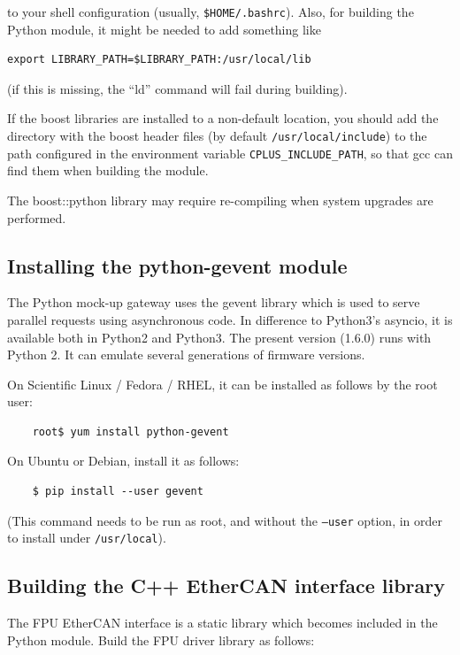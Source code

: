 \documentclass[fontsize=12,a4paper]{scrreprt}
\begin{document}
to your shell configuration (usually, \verb+$HOME/.bashrc+).
Also, for building the Python module, it might be needed
to add something like

\begin{verbatim}
export LIBRARY_PATH=$LIBRARY_PATH:/usr/local/lib
\end{verbatim}
(if this is missing, the ``ld'' command will fail during building).



If the boost libraries are installed to a non-default location, you
should add the directory with the boost header files (by default
\verb+/usr/local/include+) to the path configured in the environment
variable \verb+CPLUS_INCLUDE_PATH+, so that gcc can find them when
building the module.

The boost::python library may require re-compiling when system
upgrades are performed.

\subsection{Installing the python-gevent module}
%
The Python mock-up gateway uses the gevent library which is used to
serve parallel requests using asynchronous code. In difference to
Python3's asyncio, it is available both in Python2 and Python3. The
present version (1.6.0) runs with Python 2. It can emulate several
generations of firmware versions.

On Scientific Linux / Fedora / RHEL, it can be installed
as follows by the root user:

  \begin{verbatim}
    root$ yum install python-gevent
  \end{verbatim}


On Ubuntu or Debian, install it as follows:

  \begin{verbatim}
    $ pip install --user gevent
  \end{verbatim}

(This command needs to be run as root, and without the \texttt{--user}
  option, in order to install under \texttt{/usr/local}).



\subsection{Building the C++ EtherCAN interface library}
The FPU EtherCAN interface is a static library which becomes included in the
Python module.  Build the FPU driver library as follows:
\end{document}
